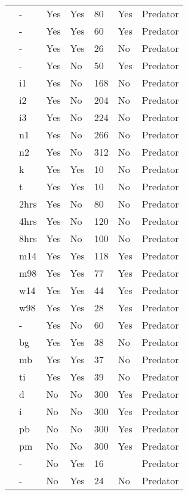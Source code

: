 \begin{table}[!tbp]
\begin{center}
\begin{tabular}{lllllll}
\citet{Prokopenko:2017aa}&-&Yes&Yes&80&Yes&Predator\tabularnewline
\citet{Pusack:2018aa}&-&Yes&Yes&60&Yes&Predator\tabularnewline
\citet{Reeve:1997aa}&-&Yes&Yes&26&No&Predator\tabularnewline
\citet{Salt:1974aa}&-&Yes&No&50&Yes&Predator\tabularnewline
\citet{Uttley:1980aa}&i1&Yes&No&168&No&Predator\tabularnewline
\citet{Uttley:1980aa}&i2&Yes&No&204&No&Predator\tabularnewline
\citet{Uttley:1980aa}&i3&Yes&No&224&No&Predator\tabularnewline
\citet{Uttley:1980aa}&n1&Yes&No&266&No&Predator\tabularnewline
\citet{Uttley:1980aa}&n2&Yes&No&312&No&Predator\tabularnewline
\citet{Vahl:2005aa}&k&Yes&Yes&10&No&Predator\tabularnewline
\citet{Vahl:2005aa}&t&Yes&Yes&10&No&Predator\tabularnewline
\citet{Von-Westernhagen:1976aa}&2hrs&Yes&No&80&No&Predator\tabularnewline
\citet{Von-Westernhagen:1976aa}&4hrs&Yes&No&120&No&Predator\tabularnewline
\citet{Von-Westernhagen:1976aa}&8hrs&Yes&No&100&No&Predator\tabularnewline
\citet{Vucetich:2002aa}&m14&Yes&Yes&118&Yes&Predator\tabularnewline
\citet{Vucetich:2002aa}&m98&Yes&Yes&77&Yes&Predator\tabularnewline
\citet{Vucetich:2002aa}&w14&Yes&Yes&44&Yes&Predator\tabularnewline
\citet{Vucetich:2002aa}&w98&Yes&Yes&28&Yes&Predator\tabularnewline
\citet{Walde:1984aa}&-&Yes&No&60&Yes&Predator\tabularnewline
\citet{Wasserman:2016aa}&bg&Yes&Yes&38&No&Predator\tabularnewline
\citet{Wasserman:2016aa}&mb&Yes&Yes&37&No&Predator\tabularnewline
\citet{Wasserman:2016aa}&ti&Yes&Yes&39&No&Predator\tabularnewline
\citet{Elliott:2003aa}&d&No&No&300&Yes&Predator\tabularnewline
\citet{Elliott:2003aa}&i&No&No&300&Yes&Predator\tabularnewline
\citet{Elliott:2003aa}&pb&No&No&300&Yes&Predator\tabularnewline
\citet{Elliott:2003aa}&pm&No&No&300&Yes&Predator\tabularnewline
\citet{Hebblewhite:2013aa}&-&No&Yes&16&&Predator\tabularnewline
\citet{Stier:2013aa}&-&No&Yes&24&No&Predator\tabularnewline
\hline
\end{tabular}\end{center}
\end{table}
